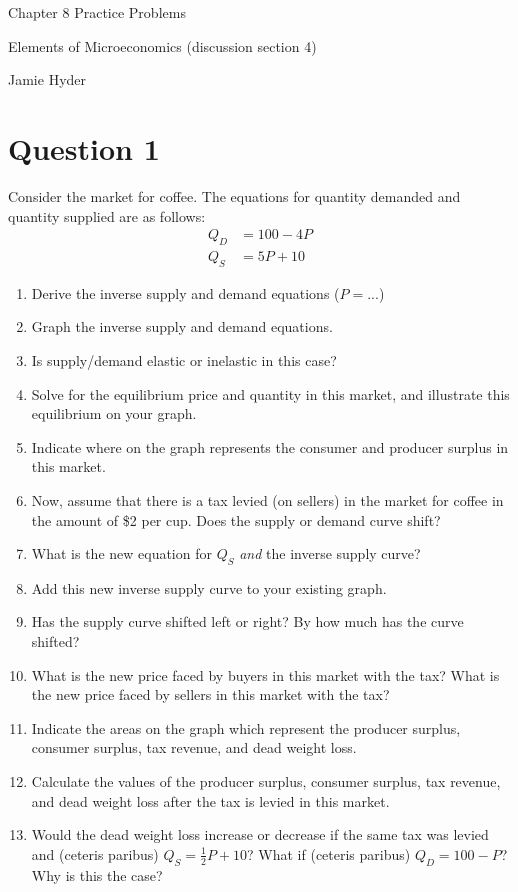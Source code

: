 \documentclass[12pt]{article}
\begin{document}
\begin{center}
\Large Chapter 8 Practice Problems

\medskip

\normalsize Elements of Microeconomics (discussion section 4)

\medskip

\small Jamie Hyder
\end{center}

\section*{Question 1}
Consider the market for coffee. The equations for quantity demanded and quantity supplied are as follows:
\begin{align*}
    Q_D &= 100-4P\\
    Q_S &= 5P + 10
\end{align*}
\begin{enumerate}[label=(\alph*)]

    \item Derive the inverse supply and demand equations ($P = ...$)
    \item Graph the inverse supply and demand equations.
    \item Is supply/demand elastic or inelastic in this case?
    \item Solve for the equilibrium price and quantity in this market, and illustrate this equilibrium on your graph.
    \item Indicate where on the graph represents the consumer and producer surplus in this market.
    \item Now, assume that there is a tax levied (on sellers) in the market for coffee in the amount of \$2 per cup. Does the supply or demand curve shift?
    \item What is the new equation for $Q_S$ \textit{and} the inverse supply curve?
    \item Add this new inverse supply curve to your existing graph. 
    \item Has the supply curve shifted left or right? By how much has the curve shifted?
    \item What is the new price faced by buyers in this market with the tax? What is the new price faced by sellers in this market with the tax?
    \item Indicate the areas on the graph which represent the producer surplus, consumer surplus, tax revenue, and dead weight loss.
    \item Calculate the values of the producer surplus, consumer surplus, tax revenue, and dead weight loss after the tax is levied in this market.
    \item Would the dead weight loss increase or decrease if the same tax was levied and (ceteris paribus) $Q_S = \frac{1}{2}P + 10$? What if (ceteris paribus) $Q_D = 100 - P$? Why is this the case? 
\end{enumerate}
\end{document}
